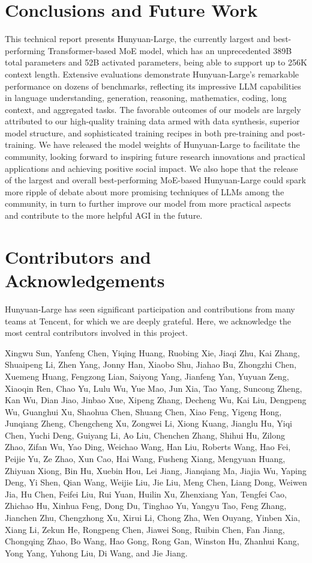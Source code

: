 \documentclass{article}
\begin{document}
\section{Conclusions and Future Work}
\label{sec:conclusion}
This technical report presents Hunyuan-Large, the currently largest and best-performing Transformer-based MoE model, which has an unprecedented 389B total parameters and 52B activated parameters, being able to support up to 256K context length. Extensive evaluations demonstrate Hunyuan-Large's remarkable performance on dozens of benchmarks, reflecting its impressive LLM capabilities in language understanding, generation, reasoning, mathematics, coding, long context, and aggregated tasks. The favorable outcomes of our models are largely attributed to our high-quality training data armed with data synthesis, superior model structure, and sophisticated training recipes in both pre-training and post-training.
We have released the model weights of Hunyuan-Large to facilitate the community, looking forward to inspiring future research innovations and practical applications and achieving positive social impact. We also hope that the release of the largest and overall best-performing MoE-based Hunyuan-Large could spark more ripple of debate about more promising techniques of LLMs among the community, in turn to further improve our model from more practical aspects and contribute to the more helpful AGI in the future.

\section*{Contributors and Acknowledgements}
\label{sec:contributors}
Hunyuan-Large has seen significant participation and contributions from many teams at Tencent, for which we are deeply grateful. Here, we acknowledge the most central contributors involved in this project.

Xingwu Sun, Yanfeng Chen, Yiqing Huang, Ruobing Xie, Jiaqi Zhu, Kai Zhang, Shuaipeng Li, Zhen Yang, Jonny Han, Xiaobo Shu, Jiahao Bu, Zhongzhi Chen, Xuemeng Huang, Fengzong Lian, Saiyong Yang, Jianfeng Yan, Yuyuan Zeng, Xiaoqin Ren, Chao Yu, Lulu Wu, Yue Mao, Jun Xia, Tao Yang, Suncong Zheng, Kan Wu, Dian Jiao, Jinbao Xue, Xipeng Zhang, Decheng Wu, Kai Liu, 
Dengpeng Wu, Guanghui Xu, Shaohua Chen, Shuang Chen, Xiao Feng, 
Yigeng Hong, Junqiang Zheng, Chengcheng Xu, Zongwei Li, Xiong Kuang, Jianglu Hu, Yiqi Chen, Yuchi Deng, Guiyang Li, Ao Liu, Chenchen Zhang, Shihui Hu, Zilong Zhao, Zifan Wu, Yao Ding, Weichao Wang, Han Liu, Roberts Wang, Hao Fei, Peijie Yu, Ze Zhao, 
Xun Cao, Hai Wang, Fusheng Xiang, Mengyuan Huang, Zhiyuan Xiong, 
Bin Hu, Xuebin Hou, Lei Jiang, Jianqiang Ma, Jiajia Wu, Yaping Deng, Yi Shen, Qian Wang, Weijie Liu, 
Jie Liu, Meng Chen, Liang Dong, Weiwen Jia, Hu Chen, Feifei Liu, 
Rui Yuan, Huilin Xu, Zhenxiang Yan, Tengfei Cao, 
Zhichao Hu, Xinhua Feng, Dong Du, Tinghao Yu, Yangyu Tao, Feng Zhang, Jianchen Zhu, Chengzhong Xu, 
Xirui Li, Chong Zha, Wen Ouyang, Yinben Xia, Xiang Li, Zekun He, Rongpeng Chen, Jiawei Song, Ruibin Chen, Fan Jiang, Chongqing Zhao, Bo Wang, Hao Gong, Rong Gan, 
Winston Hu, Zhanhui Kang, Yong Yang, Yuhong Liu, Di Wang, and Jie Jiang. 

\newpage



\end{document}
